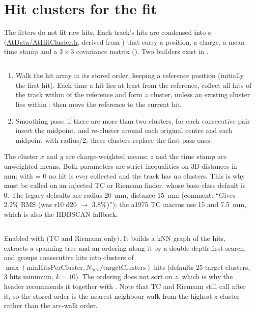 \section{Hit clusters for the fit}
\label{sec:pr:clusters}

The fitters do not fit raw hits. Each track's hits are condensed into s
(\url{AtData/AtHitCluster.h}, derived from ) that carry a position, a charge, a mean time
stamp and a $3\times3$ covariance matrix (). Two builders exist in
.

\subsection{}

\begin{enumerate}
\item Walk the hit array in its stored order, keeping a reference position (initially the first hit).
  Each time a hit lies at least  from the reference, collect all hits of the track within
   of the reference and form a cluster, unless an existing cluster lies within
  ; then move the reference to the current hit.
\item Smoothing pass: if there are more than two clusters, for each consecutive pair insert the midpoint,
  and re-cluster around each original centre and each midpoint with radius/2; these clusters replace the
  first-pass ones.
\end{enumerate}
The cluster $x$ and $y$ are charge-weighted means; $z$ and the time stamp are unweighted means. Both
parameters are strict inequalities on 3D distances in mm: with  = 0 no hit is ever collected
and the track has no clusters. This is why  must be called on an injected TC or
Riemann finder, whose base-class default is 0. The  legacy defaults are radius 20~mm,
distance 15~mm (comment: ``Gives 2.2\% RMS (was r10 d20 $\to$ 3.8\%)''); the a1975 TC macros use 15 and
7.5~mm, which is also the HDBSCAN fallback.

\subsection{}

Enabled with  (TC and Riemann only). It builds a kNN graph of the hits, extracts a
spanning tree and an ordering along it by a double depth-first search, and groups consecutive hits into
clusters of $\max(\mathrm{minHitsPerCluster}, N_\mathrm{hits}/\mathrm{targetClusters})$ hits (defaults 25
target clusters, 3 hits minimum, $k=10$). The ordering does not sort on $z$, which is why the
 header recommends it together with . Note that TC and Riemann
still call  after it, so the stored order is the nearest-neighbour walk from the
highest-$z$ cluster rather than the arc-walk order.

